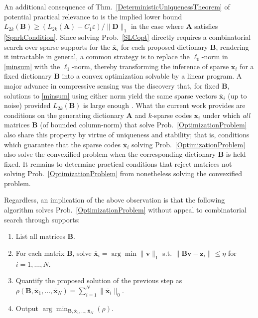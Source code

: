An additional consequence of Thm.~\ref{DeterministicUniquenessTheorem} of potential practical relevance to is the implied lower bound $L_{2k}(\mathbf{B}) \geq \left(L_{2k}(\mathbf{A}) - C_1\varepsilon \right) / \|\mathbf{D}\|_1$ in the case where $\mathbf{A}$ satisfies \eqref{SparkCondition}. Since solving Prob.~\ref{SLCopt} directly requires a combinatorial search over sparse supports for the $\mathbf{\overline x}_i$ for each proposed dictionary $\mathbf{B}$, rendering it intractable in general, a common strategy is to replace the $\ell_0$-norm in \eqref{minsum} with the $\ell_1$-norm, thereby transforming the inference of sparse $\mathbf{\overline x}_i$ for a fixed dictionary $\mathbf{B}$ into a convex optimization solvable by a linear program. A major advance in compressive sensing was the discovery that, for fixed $\mathbf{B}$, solutions to \eqref{minsum} using either norm yield the same sparse vectors $\mathbf{\overline x}_i$ (up to noise) provided $L_{2k}(\mathbf{B})$ is large enough \cite{?}. What the current work provides are conditions on the generating dictionary $\mathbf{A}$ and $k$-sparse codes $\mathbf{x}_i$ under which \emph{all} matrices $\mathbf{B}$ (of bounded column-norm) that solve Prob.~\ref{OptimizationProblem} also share this property by virtue of uniqueness and stability; that is, conditions which guarantee that the sparse codes $\mathbf{\overline x}_i$ solving Prob.~\ref{OptimizationProblem} also solve the convexified problem when the corresponding dictionary $\mathbf{B}$ is held fixed. It remains to determine practical conditions that reject matrices not solving Prob.~\ref{OptimizationProblem} from nonetheless solving the convexified problem.
%

Regardless, an implication of the above observation is that the following algorithm solves Prob.~\ref{OptimizationProblem} without appeal to combinatorial search through supports:
\begin{enumerate}
\item List all matrices $\mathbf{B}$.
\item For each matrix $\mathbf{B}$, solve $\mathbf{\overline x}_i = \arg \min \|\mathbf{v}\|_1$ s.t. $\|\mathbf{Bv} - \mathbf{z}_i\| \leq \eta$ for $i = 1, \ldots, N$.
\item Quantify the proposed solution of the previous step as $\rho(\mathbf{B}, \mathbf{\overline x}_1, \ldots, \mathbf{\overline x}_N) = \sum_{i=1}^{N} \|\mathbf{\overline x}_i\|_0$.
\item Output $\arg \min_{\mathbf{B}, \mathbf{\overline x}_1, \ldots, \mathbf{\overline x}_N} \left( \rho \right)$.
 \end{enumerate}
%


